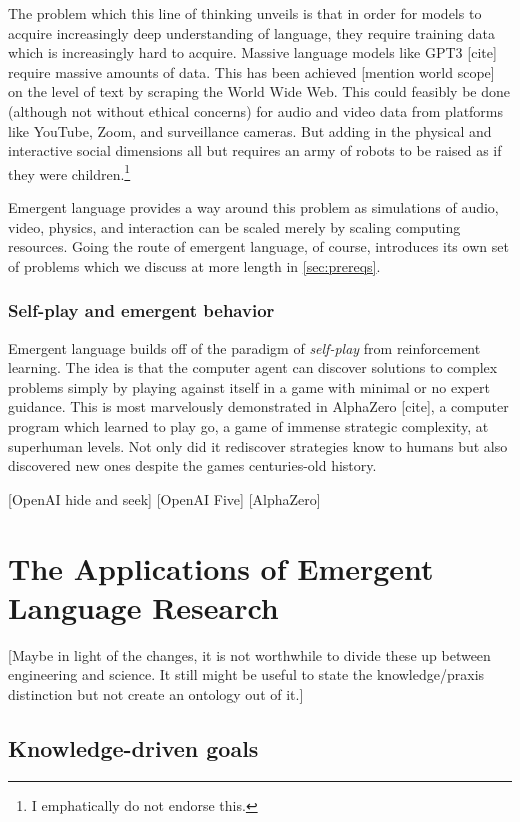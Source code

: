 \documentclass[letterpaper]{report}
\newcommand\cmg[1]{{\color{gray}[#1]}}
\begin{document}
The problem which this line of thinking unveils is that in order for models to acquire increasingly deep understanding of language, they require training data which is increasingly hard to acquire.
Massive language models like GPT3 \cmg{cite} require massive amounts of data.
This has been achieved \cmg{mention world scope} on the level of text by scraping the World Wide Web.
This could feasibly be done (although not without ethical concerns) for audio and video data from platforms like YouTube, Zoom, and surveillance cameras.
But adding in the physical and interactive social dimensions all but requires an army of robots to be raised as if they were children.\footnote{I emphatically do not endorse this.}

Emergent language provides a way around this problem as simulations of audio, video, physics, and interaction can be scaled merely by scaling computing resources.
Going the route of emergent language, of course, introduces its own set of problems which we discuss at more length in \cref{sec:prereqs}.


\subsection{Self-play and emergent behavior}
Emergent language builds off of the paradigm of \emph{self-play} from reinforcement learning.
The idea is that the computer agent can discover solutions to complex problems simply by playing against itself in a game with minimal or no expert guidance.
This is most marvelously demonstrated in AlphaZero \cmg{cite}, a computer program which learned to play go, a game of immense strategic complexity, at superhuman levels.
Not only did it rediscover strategies know to humans but also discovered new ones despite the games centuries-old history.

\cmg{OpenAI hide and seek}
\cmg{OpenAI Five}
\cmg{AlphaZero}

\chapter{The Applications of Emergent Language Research}\label{sec:goals}
\cmg{Maybe in light of the changes, it is not worthwhile to divide these up between engineering and science. It still might be useful to state the knowledge/praxis distinction but not create an ontology out of it.}
\section{Knowledge-driven goals}
\end{document}
